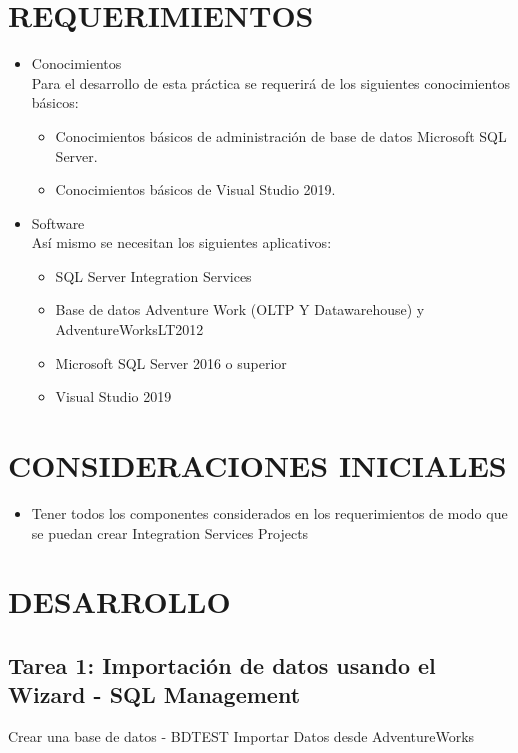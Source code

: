 \documentclass[12pt,letterpaper]{article}
\begin{document}
\section{REQUERIMIENTOS}
\begin{itemize}
    \item Conocimientos\\
          Para el desarrollo de esta práctica se requerirá de los siguientes conocimientos básicos:
          \begin{itemize}
              \item Conocimientos básicos de administración de base de datos Microsoft SQL Server.
              \item Conocimientos básicos de Visual Studio 2019.
          \end{itemize}
    \item Software\\
          Así mismo se necesitan los siguientes aplicativos:
          \begin{itemize}
              \item SQL Server Integration Services
              \item Base de datos Adventure Work (OLTP Y Datawarehouse) y AdventureWorksLT2012
              \item Microsoft SQL Server 2016 o superior
              \item Visual Studio 2019
          \end{itemize}
\end{itemize}

\section{CONSIDERACIONES INICIALES}
\begin{itemize}
    \item Tener todos los componentes considerados en los requerimientos de modo que se puedan crear Integration Services Projects
\end{itemize}

\newpage
\section{DESARROLLO}
\subsection{Tarea 1: Importación de datos usando el Wizard - SQL Management}
Crear una base de datos - BDTEST
Importar Datos desde AdventureWorks
\end{document}
